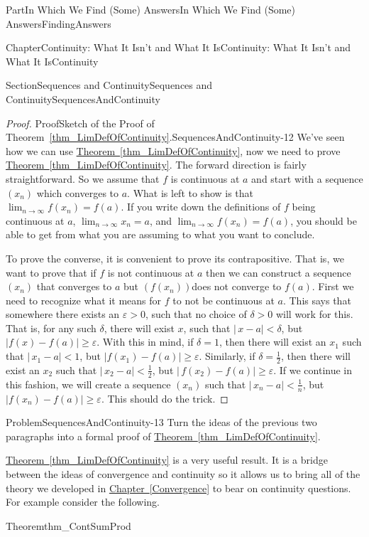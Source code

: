 \documentclass[oneside,10pt,]{book}
\newcommand{\xreffont}{\relax}
\numberwithin{equation}{part}
\def\limit#1#2#3{{\displaystyle\lim_{#1\rightarrow #2}#3}}
\newcommand{\eps}{\varepsilon}
\newcommand{\lt}{<}
\begin{document}
\begin{partptx}{Part}{In Which We Find (Some) Answers}{}{In Which We Find (Some) Answers}{}{}{FindingAnswers}
\begin{chapterptx}{Chapter}{Continuity: What It Isn't and What It Is}{}{Continuity: What It Isn't and What It Is}{}{}{Continuity}
\begin{sectionptx}{Section}{Sequences and Continuity}{}{Sequences and Continuity}{}{}{SequencesAndContinuity}
\begin{proof}{Proof}{Sketch of the Proof of Theorem~{\xreffont\ref*{thm_LimDefOfContinuity}}.}{SequencesAndContinuity-12}
We've seen how we can use \hyperref[thm_LimDefOfContinuity]{Theorem~{\xreffont\ref{thm_LimDefOfContinuity}}}, now we need to prove \hyperref[thm_LimDefOfContinuity]{Theorem~{\xreffont\ref{thm_LimDefOfContinuity}}}.  The forward direction is fairly straightforward.  So we assume that \(f\) is continuous at \(a\) and start with a sequence \(\left(x_n\right)\) which converges to \(a\). What is left to show is that \(\lim_{n\rightarrow\infty}f(x_n)=f(a)\).  If you write down the definitions of \(f\) being continuous at \(a\), \(\lim_{n\rightarrow\infty}x_n=a\), and \(\lim_{n\rightarrow\infty}f(x_n)=f(a)\), you should be able to get from what you are assuming to what you want to conclude.%
\par
To prove the converse, it is convenient to prove its contrapositive.  That is, we want to prove that if \(f\) is not continuous at \(a\) then we can construct a sequence \(\left(x_n\right)\) that converges to \(a\) but \(\left(f(x_n)\right)\)does not converge to \(f(a)\). First we need to recognize what it means for \(f\) to not be continuous at \(a\).  This says that somewhere there exists an \(\eps>0\), such that no choice of \(\delta>0\) will work for this.  That is, for any such \(\delta\), there will exist \(x\), such that \(|\,x-a|\lt \delta\), but \(|f(x)-f(a)|\geq\eps\). With this in mind, if \(\delta=1\), then there will exist an \(x_1\) such that \(|\,x_1-a|\lt 1\), but \(|f(x_1)-f(a)|\geq\eps\).  Similarly, if \(\delta=\frac{1}{2}\), then there will exist an \(x_2\) such that \(|\,x_2-a|\lt \frac{1}{2}\), but \(|\,f(x_2)-f(a)|\geq\eps\).  If we continue in this fashion, we will create a sequence \(\left(x_n\right)\) such that \(|\,x_n-a|\lt \frac{1}{n}\), but \(|f(x_n)-f(a)|\geq\eps\).  This should do the trick.%
\end{proof}
\begin{problem}{Problem}{}{SequencesAndContinuity-13}%
\index{limit!\(\limit{x}{a}{f(x)}=f(a)\) implies \(f(x)\) is continuous} Turn the ideas of the previous two paragraphs into a formal proof of \hyperref[thm_LimDefOfContinuity]{Theorem~{\xreffont\ref{thm_LimDefOfContinuity}}}.%
\end{problem}
\hyperref[thm_LimDefOfContinuity]{Theorem~{\xreffont\ref{thm_LimDefOfContinuity}}} is a very useful result. It is a bridge between the ideas of convergence and continuity so it allows us to bring all of the theory we developed in \hyperref[Convergence]{Chapter~{\xreffont\ref{Convergence}}} to bear on continuity questions. For example consider the following.%
\begin{theorem}{Theorem}{}{}{thm_ContSumProd}%

\end{theorem}
\end{sectionptx}
\end{chapterptx}
\end{partptx}
\end{document}
